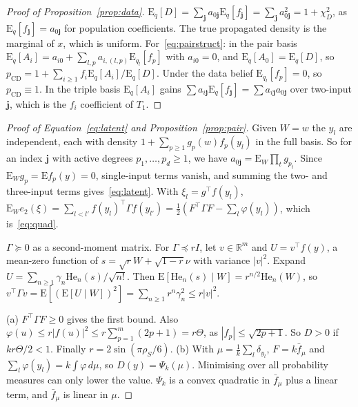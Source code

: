 \documentclass[10pt,a4paper]{article}
\newcommand{\pcd}{p_{\mathrm{CD}}}
\newcommand{\rs}{\rho_S}
\newcommand{\Eq}{\mathrm{E}_q}
\newcommand{\EW}{\mathrm{E}_W}
\theoremstyle{upright}
\begin{document}
\begin{proof}[Proof of Proposition~\ref{prop:data}]
$\Eq[D]=\sum_{\mathbf{j}}a_{0\mathbf{j}}\Eq[f_{\mathbf{j}}]=\sum_{\mathbf{j}}a_{0\mathbf{j}}^2=1+\chi_D^2$, as $\Eq[f_{\mathbf{j}}]=a_{0\mathbf{j}}$ for population coefficients. The true propagated density is the marginal of $x$, which is uniform. For~\eqref{eq:pairstruct}: in the pair basis $\Eq[A_i]=a_{i0}+\sum_{l,p}a_{i,(l,p)}\mathrm{E}_{q_l}[f_p]$ with $a_{i0}=0$, and $\Eq[A_0]=\Eq[D]$, so $\pcd=1+\sum_{i\geq1}f_i\Eq[A_i]/\Eq[D]$. Under the data belief $\mathrm{E}_{q_l}[f_p]=0$, so $\pcd\equiv1$. In the triple basis $\Eq[A_i]$ gains $\sum a_{i\mathbf{j}}\Eq[f_{\mathbf{j}}]=\sum a_{i\mathbf{j}}a_{0\mathbf{j}}$ over two-input $\mathbf{j}$, which is the $f_i$ coefficient of $T_1$.
\end{proof}

\begin{proof}[Proof of Equation~\eqref{eq:latent} and Proposition~\ref{prop:pair}]
Given $W=w$ the $y_l$ are independent, each with density $1+\sum_{p\geq1}g_p(w)f_p(y_l)$ in the full basis. So for an index $\mathbf{j}$ with active degrees $p_1,\dots,p_d\geq1$, we have $a_{0\mathbf{j}}=\EW\prod_tg_{p_t}$. Since $\EW g_p=\mathrm{E}f_p(y)=0$, single-input terms vanish, and summing the two- and three-input terms gives~\eqref{eq:latent}. With $\xi_l=g^\top f(y_l)$, $\EW e_2(\xi)=\sum_{l<l'}f(y_l)^\top \Gamma f(y_{l'})=\frac12(F^\top \Gamma F-\sum_l\varphi(y_l))$, which is~\eqref{eq:quad}.

$\Gamma\succeq0$ as a second-moment matrix. For $\Gamma\preceq rI$, let $v\in\mathbb R^m$ and $U=v^\top f(y)$, a mean-zero function of $s=\sqrt rW+\sqrt{1-r}\nu$ with variance $|v|^2$. Expand $U=\sum_{n\geq1}\gamma_n\mathrm{He}_n(s)/\sqrt{n!}$. Then $\mathrm{E}[\mathrm{He}_n(s)\mid W]=r^{n/2}\mathrm{He}_n(W)$, so $v^\top \Gamma v=\mathrm{E}[(\mathrm{E}[U\mid W])^2]=\sum_{n\geq1}r^n\gamma_n^2\leq r|v|^2$.

(a) $F^\top \Gamma F\geq0$ gives the first bound. Also $\varphi(u)\leq r|f(u)|^2\leq r\sum_{p=1}^m(2p+1)=r\Theta$, as $|f_p|\leq\sqrt{2p+1}$. So $D>0$ if $k r\Theta/2<1$. Finally $r=2\sin(\pi\rs/6)$.
(b) With $\mu=\frac1k\sum_l\delta_{y_l}$, $F=k\bar f_\mu$ and $\sum_l\varphi(y_l)=k\int\varphi\,d\mu$, so $D(y)=\Psi_k(\mu)$. Minimising over all probability measures can only lower the value. $\Psi_k$ is a convex quadratic in $\bar f_\mu$ plus a linear term, and $\bar f_\mu$ is linear in $\mu$.
\end{proof}
\end{document}
